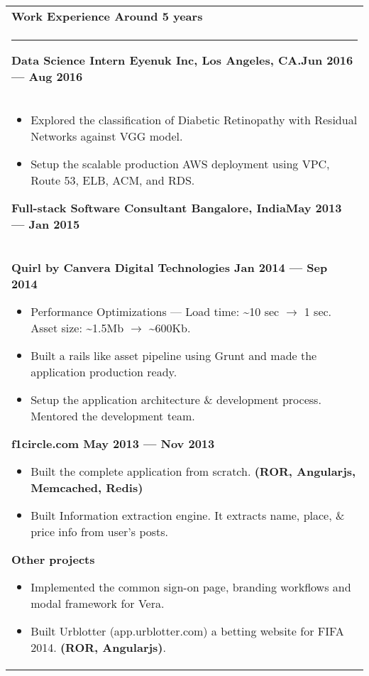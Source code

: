 \documentclass{article}
\begin{document}
\begin{tabular}{p{\dimexpr\linewidth-2\tabcolsep}}
	\bfseries \large{Work Experience} \hfill Around 5 years \\
	\noindent\rule{\textwidth}{0.4pt}
	\smallskip
	{\bfseries Data Science Intern \hfill Eyenuk Inc, Los Angeles, CA\@.\hfill Jun 2016 --- Aug 2016} \\
	\begin{itemize}
		\item Explored the classification of Diabetic Retinopathy with Residual Networks against VGG model.
		\item Setup the scalable production AWS deployment using VPC, Route 53, ELB, ACM, and RDS\@.
	\end{itemize}

	\bigskip
	{\bfseries Full-stack Software Consultant \hfill Bangalore, India\hfill May 2013 --- Jan 2015}\\
	\smallskip
	\bfseries \enskip{} Quirl by Canvera Digital Technologies \hfill Jan 2014 --- Sep 2014 \mdseries
	\smallskip
	\begin{itemize}
		\item Performance Optimizations --- Load time: \textasciitilde10 sec \( \rightarrow \) 1 sec. Asset size: \textasciitilde1.5Mb \( \rightarrow \) \textasciitilde600Kb.
		\item Built a rails like asset pipeline using Grunt and made the application production ready.
		\item Setup the application architecture \& development process. Mentored the development team.
	\end{itemize}
	\bigskip
	\bfseries \enskip{} f1circle.com \hfill May 2013 --- Nov 2013 \mdseries 
	\smallskip
	\begin{itemize}
		\item Built the complete application from scratch. \textbf{(ROR, Angularjs, Memcached, Redis)}
		\item Built Information extraction engine. It extracts name, place, \& price info from user's posts.
	\end{itemize}
	\bigskip
	\bfseries \enskip{} Other projects  \mdseries
	\smallskip
	\begin{itemize}
		\item Implemented the common sign-on page, branding workflows and modal framework for Vera.
		\item Built Urblotter (app.urblotter.com) a betting website for FIFA 2014. \textbf{(ROR, Angularjs)}.
	\end{itemize}
	\bigskip
	\smallskip


\end{tabular}
\end{document}
